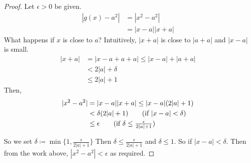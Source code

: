 \documentclass[openany]{report}
\begin{document}
\begin{proof}
    Let $\epsilon > 0$ be given.
    \begin{align*}
        |g(x) - a^2| &= |x^2 - a^2| \\
        & = |x - a| |x + a|
    \end{align*}
    What happens if $x$ is close to $a$? Intuitively, $|x + a|$ is close to $|a+a|$
    and $|x-a|$ is small.
    \begin{align*}
        |x+a| &= |x -a + a + a| \leq |x - a| + |a + a|\\
              &< 2|a| + \delta \tag{if $|x-a|<\delta$}\\
              &\leq 2|a| + 1\tag{$\delta \leq 1$}
    \end{align*}
    Then, 
    \begin{align*}
        |x^2 - a^2| &= |x-a||x+a|\leq |x-a|(2|a| + 1)\\
                    &< \delta(2|a| + 1)\tag{if $|x-a|<\delta$}\\
                    &\leq \epsilon\tag{if $\delta \leq \frac{\epsilon}{2|a| + 1}$}
    \end{align*}
    \begin{center}
    \end{center}
    So we set $\delta \coloneqq \min \{1, \frac{\epsilon}{2|a| + 1}\}$
    Then $\delta \leq \frac{\epsilon}{2|a| + 1}$ and $\delta \leq 1$. So
    if $|x-a| < \delta$. Then from the work above, $|x^2-a^2| < \epsilon$ as required.
\end{proof}
\end{document}
